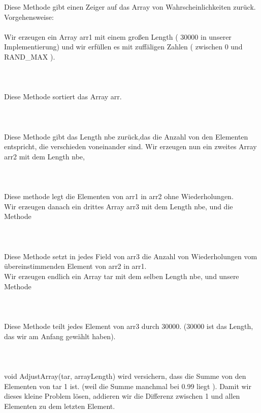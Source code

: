 \documentclass[11pt]{article}
\begin{document}
Diese Methode gibt einen Zeiger auf das Array von Wahrscheinlichkeiten zur\"uck.
Vorgehensweise:\\\\
Wir erzeugen ein Array arr1 mit einem großen Length ( 30000 in unserer Implementierung) und wir erf\"ullen es mit zuff\"aligen Zahlen ( zwischen 0 und RAND\_MAX ).\\\\
{\color{red}{\Large  void sortArray(int *arr, int ls) }}\\\\
Diese Methode sortiert das Array arr.\\\\
{\color{red}{\Large  numberOfDifferentElements(arr1, length) :}}\\\\
Diese Methode gibt das Length nbe zur\"uck,das die Anzahl von den Elementen entspricht, die verschieden voneinander sind.
Wir erzeugen nun ein zweites Array arr2 mit dem Length nbe, \\\\
{\color{red}{\Large  arrayWithoutRepetition(arr1, arr2, length, nbe)}}\\\\
Diese methode legt die Elementen von arr1 in arr2 ohne Wiederholungen.\\
Wir erzeugen danach ein drittes Array arr3 mit dem Length nbe, und die Methode \\\\
{\color{red}{\Large  arrayWithNumberOfEelemts(arr3, arr2, arr1, nbe, length): }}\\\\
 Diese Methode setzt in jedes Field von arr3 die Anzahl von Wiederholungen vom \"ubereinstimmenden Element von arr2 in arr1.\\
Wir erzeugen endlich ein Array tar mit dem selben Length nbe, und unsere Methode\\ \\
{\color{red}{\Large  calcProbability(arr3, tar, nbe, length):}}\\\\
Diese Methode teilt jedes Element von arr3 durch 30000. (30000 ist das Length, das wir am Anfang gew\"ahlt haben).\\\\
{\color{red}{\Large  Bemerkung:}}\\\\
{\color{red} void AdjustArray(tar, arrayLength)} wird versichern, dass die Summe von den Elementen von tar 1 ist. (weil die Summe manchmal bei 0.99 liegt ). Damit wir dieses kleine Problem l\"osen, addieren wir die Differenz zwischen 1 und allen Elementen zu dem letzten Element.\\\\
\end{document}
